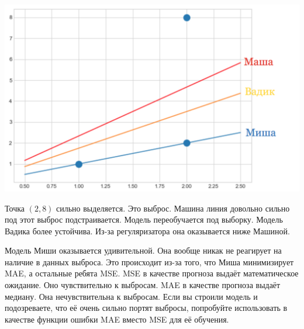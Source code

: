 \documentclass[12pt, a4paper, oneside]{article}
\begin{document}
{\begin{enumerate}
	\begin{center}
		\includegraphics[scale=0.3]{reg_83.png}
	\end{center}
	
	Точка $(2,8)$ сильно выделяется. Это выброс. Машина линия довольно сильно под этот выброс подстраивается. Модель переобучается под выборку. Модель Вадика более устойчива. Из-за регуляризатора она оказывается ниже Машиной.
	
	Модель Миши оказывается удивительной. Она вообще никак не реагирует на наличие в данных выброса. Это происходит из-за того, что Миша минимизирует MAE, а остальные ребята MSE. MSE в качестве прогноза выдаёт математическое ожидание. Оно чувствительно к выбросам. MAE в качестве прогноза выдаёт медиану. Она нечувствительна к выбросам. Если вы строили модель и подозреваете, что её очень сильно портят выбросы, попробуйте использовать в качестве функции ошибки MAE вместо MSE для её обучения. 
\end{enumerate}	
}
\end{document}
